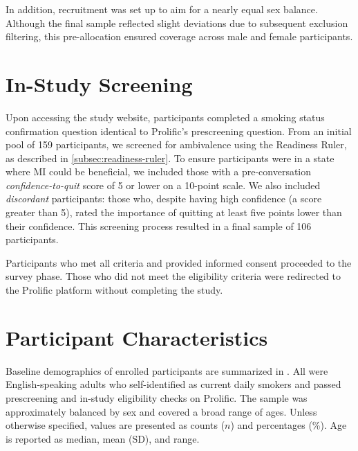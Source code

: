 In addition, recruitment was set up to aim for a nearly equal sex balance. Although the final sample reflected slight deviations due to subsequent exclusion filtering, this pre-allocation ensured coverage across male and female participants.

\section{In-Study Screening}
Upon accessing the study website, participants completed a smoking status confirmation question identical to Prolific's prescreening question. From an initial pool of 159 participants, we screened for ambivalence using the Readiness Ruler, as described in \cref{subsec:readiness-ruler}. To ensure participants were in a state where MI could be beneficial, we included those with a pre-conversation \emph{confidence-to-quit} score of 5 or lower on a 10-point scale. We also included \emph{discordant}
participants: those who, despite having high confidence (a score greater than 5), rated the importance of quitting at least five points lower than their confidence. This screening process resulted in a final sample of 106 participants.

Participants who met all criteria and provided informed consent proceeded to the survey phase. Those who did not meet the eligibility criteria were redirected to the Prolific platform without completing the study.

\section{Participant Characteristics}
\label{subsec:participant-characteristics}
\noindent Baseline demographics of enrolled participants are summarized in . All were English-speaking adults who self-identified as current daily smokers and passed prescreening and in-study eligibility checks on Prolific. The sample was approximately balanced by sex and covered a broad range of ages. Unless otherwise specified, values are presented as counts ($n$) and percentages (\%). Age is reported as median, mean (SD), and range.

